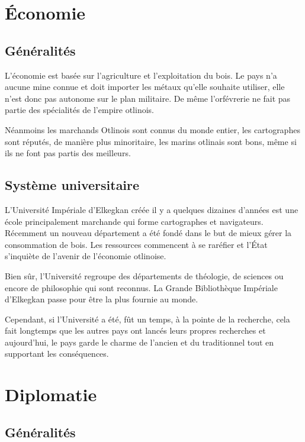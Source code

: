 \documentclass[french, a4paper, 12pt]{article}
\begin{document}
\section{Économie}

\subsection{Généralités}

L'économie est basée sur l'agriculture et l'exploitation du bois. Le pays n'a aucune mine connue et doit importer les métaux qu'elle souhaite utiliser, elle n'est donc pas autonome sur le plan militaire. De même l'orfévrerie ne fait pas partie des spécialités de l'empire otlinois.

Néanmoins les marchands Otlinois sont connus du monde entier, les cartographes sont réputés, de manière plus minoritaire, les marins otlinais sont bons, même si ils ne font pas partis des meilleurs.

\subsection{Système universitaire}

L'Université Impériale d'Elkegkan créée il y a quelques dizaines d'années est une école principalement marchande qui forme cartographes et navigateurs. Récemment un nouveau département a été fondé dans le but de mieux gérer la consommation de bois. Les ressources commencent à se raréfier et l'État s'inquiète de l'avenir de l'économie otlinoise.

Bien sûr, l'Université regroupe des départements de théologie, de sciences ou encore de philosophie qui sont reconnus. La Grande Bibliothèque Impériale d'Elkegkan passe pour être la plus fournie au monde.

Cependant, si l'Université a été, fût un temps, à la pointe de la recherche, cela fait longtemps que les autres pays ont lancés leurs propres recherches et aujourd'hui, le pays garde le charme de l'ancien et du traditionnel tout en supportant les conséquences.

\section{Diplomatie}

\subsection{Généralités}
\end{document}
